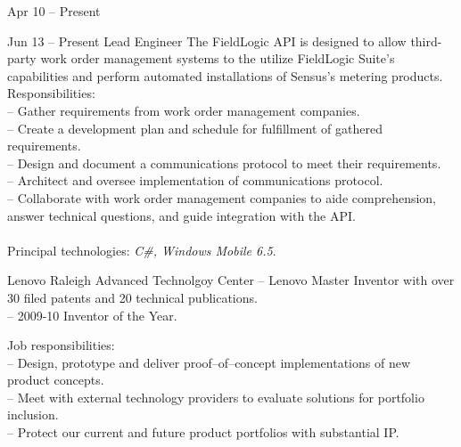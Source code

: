 \documentclass[a4paper, 10pt]{article}
\begin{document}
\begin{resume}
\begin{block}
\begin{subcategory}{Apr 10 -- Present}
            \end{subcategory}
            \begin{subcategory}{Jun 13 -- Present}
                 {Lead Engineer}
                The FieldLogic API is designed to allow third-party work order management systems
                to the utilize FieldLogic Suite's capabilities and perform automated installations
                of Sensus's metering products.
                \\[1ex]
                Responsibilities: \\
                -- Gather requirements from work order management companies. \\
                -- Create a development plan and schedule for fulfillment of gathered requirements. \\
                -- Design and document a communications protocol to meet their requirements. \\
                -- Architect and oversee implementation of communications protocol. \\
                -- Collaborate with work order management companies to aide comprehension,
                answer technical questions, and guide integration with the API. \\
                \\[1ex]
                Principal technologies: \emph{C\#, Windows Mobile 6.5}.
                \bigskip
            \end{subcategory}
        \end{block}
        \begin{block}
            \begin{category}{Lenovo}
                 {Raleigh Advanced Technolgoy Center}
                -- Lenovo Master Inventor with over 30 filed patents and 20 technical publications. \\
                -- 2009-10 Inventor of the Year. \\
                \par
                Job responsibilities: \\
                -- Design, prototype and deliver proof--of--concept implementations of new product concepts. \\
                -- Meet with external technology providers to evaluate solutions for portfolio inclusion. \\
                -- Protect our current and future product portfolios with substantial IP.

\end{category}
\end{block}
\end{resume}
\end{document}
